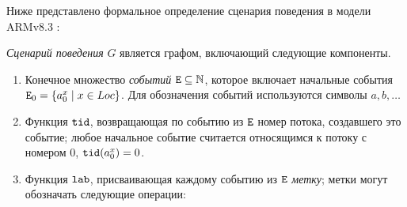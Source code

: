 Ниже представлено формальное определение сценария поведения в
модели ARMv8.3 \cite{Pulte-al:POPL18}:
\begin{definition}
\label{def:execution}
\emph{Сценарий поведения} $G$ является графом, включающий следующие компоненты.
\begin{enumerate}
\item Конечное множество \emph{событий} ${\mathtt{E}} \subseteq \mathbb{N}$, которое включает 
      начальные события ${\mathtt{E}}_0 = \{ a^x_0 \; | \; x \in Loc \}$.
      Для обозначения событий используются символы $a,b,\ldots$
\item Функция ${\mathtt{tid}}$, возвращающая по событию из ${\mathtt{E}}$  номер потока, создавшего это событие;
любое начальное событие считается относящимся к потоку с номером 0, ${\mathtt{tid}}(a^x_0) = 0$.
\item Функция ${\mathtt{lab}}$, присваивающая каждому событию из ${\mathtt{E}}$ \emph{метку}; метки могут обозначать следующие операции: 
      

\end{enumerate}
\end{definition}
